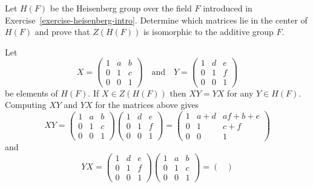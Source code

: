  Let $H(F)$ be the Heisenberg group over the field $F$
introduced in Exercise~\ref{exercise-heisenberg-intro}. Determine
which matrices lie in the center of $H(F)$ and prove that $Z(H(F))$ is
isomorphic to the additive group $F$.
\begin{solution}
  Let
  \begin{equation*}
    X =
    \begin{pmatrix}
      1 & a & b \\
      0 & 1 & c \\
      0 & 0 & 1
    \end{pmatrix}
    \quad\text{and}\quad
    Y =
    \begin{pmatrix}
      1 & d & e \\
      0 & 1 & f \\
      0 & 0 & 1
    \end{pmatrix}
  \end{equation*}
  be elements of $H(F)$. If $X\in Z(H(F))$ then $XY = YX$ for any
  $Y\in H(F)$. Computing $XY$ and $YX$ for the matrices above gives
  \begin{equation*}
    XY =
    \begin{pmatrix}
      1 & a & b \\
      0 & 1 & c \\
      0 & 0 & 1
    \end{pmatrix}
    \begin{pmatrix}
      1 & d & e \\
      0 & 1 & f \\
      0 & 0 & 1
    \end{pmatrix}
    =
    \begin{pmatrix}
      1 & a + d & af + b + e \\
      0 & 1 & c + f \\
      0 & 0 & 1
    \end{pmatrix}
  \end{equation*}
  and
  \begin{equation*}
    YX =
    \begin{pmatrix}
      1 & d & e \\
      0 & 1 & f \\
      0 & 0 & 1
    \end{pmatrix}
    \begin{pmatrix}
      1 & a & b \\
      0 & 1 & c \\
      0 & 0 & 1
    \end{pmatrix}
    =
    \begin{pmatrix}

\end{pmatrix}
\end{equation*}
\end{solution}
